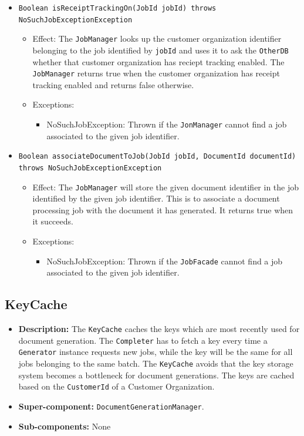 \documentclass[a4paper,10pt]{article}
\begin{document}
\begin{itemize}
\begin{itemize}
    	
    	\item \texttt{Boolean isReceiptTrackingOn(JobId jobId) throws NoSuchJobExceptionException}
    	\begin{itemize}
    		\item Effect: The \texttt{JobManager} looks up the customer organization identifier belonging to the job identified by \texttt{jobId} and uses it to ask the \texttt{OtherDB} whether that customer organization has reciept tracking enabled. The \texttt{JobManager} returns true when the customer organization has receipt tracking enabled and returns false otherwise.
    		\item Exceptions:
    		\begin{itemize}
    			\item NoSuchJobException: Thrown if the \texttt{JonManager} cannot find a job associated to the given job identifier.
    		\end{itemize}
    	\end{itemize}
    	
    	\item \texttt{Boolean associateDocumentToJob(JobId jobId, DocumentId documentId) throws NoSuchJobExceptionException}
    	\begin{itemize}
    		\item Effect: The \texttt{JobManager} will store the given document identifier in the job identified by the given job identifier. This is to associate a document processing job with the document it has generated. It returns true when it succeeds.
    		\item Exceptions:
    		\begin{itemize}
    			\item NoSuchJobException: Thrown if the \texttt{JobFacade} cannot find a job associated to the given job identifier.
    		\end{itemize}
    	\end{itemize} 	    	
 	   
    \end{itemize}     
\end{itemize}

\subsection{KeyCache}
\begin{itemize}
    \item \textbf{Description:} The \texttt{KeyCache} caches the keys which are most recently used for document generation. The \texttt{Completer} has to fetch a key every time a \texttt{Generator} instance requests new jobs, while the key will be the same for all jobs belonging to the same batch. The \texttt{KeyCache} avoids that the key storage system becomes a bottleneck for document generations. The keys are cached based on the \texttt{CustomerId} of a Customer Organization.
    \item \textbf{Super-component:}  \texttt{DocumentGenerationManager}.
    \item \textbf{Sub-components:} None
\end{itemize}
\end{document}
